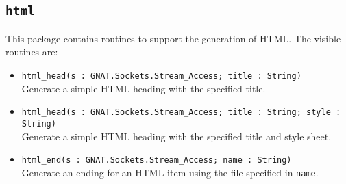 \documentclass[10pt, openany, draft]{article}
\begin{document}
\subsection{\texttt{html}}
This package contains routines to support the generation of HTML.  The visible routines are:
\begin{itemize}
  \item \verb|html_head(s : GNAT.Sockets.Stream_Access; title : String)|\\
  Generate a simple HTML heading with the specified title.
  \item \verb|html_head(s : GNAT.Sockets.Stream_Access; title : String; style : String)|\\
  Generate a simple HTML heading with the specified title and style sheet.
  \item \verb|html_end(s : GNAT.Sockets.Stream_Access; name : String)|\\
  Generate an ending for an HTML item using the file specified in \texttt{name}.
\end{itemize}
\end{document}
